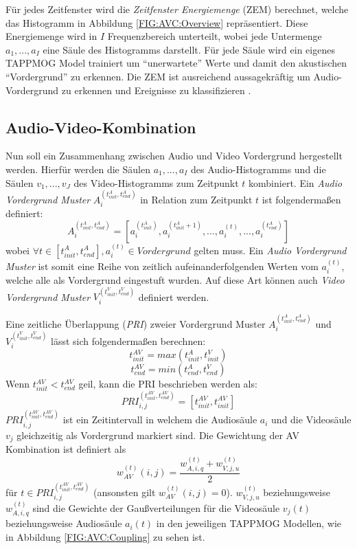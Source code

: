 Für jedes Zeitfenster wird die \textit{Zeitfenster Energiemenge} (ZEM) berechnet, welche das Histogramm in Abbildung \ref{FIG:AVC:Overview} repräsentiert. Diese Energiemenge wird in $I$ Frequenzbereich unterteilt, wobei jede Untermenge $a_1, ..., a_I$ eine Säule des Histogramms darstellt. Für jede Säule wird ein eigenes TAPPMOG Model trainiert um ``unerwartete'' Werte und damit den akustischen ``Vordergrund'' zu erkennen. Die ZEM ist ausreichend aussagekräftig um Audio-Vordergrund zu erkennen und Ereignisse zu klassifizieren \cite{Row:OMSS}.

\subsection{Audio-Video-Kombination}

Nun soll ein Zusammenhang zwischen Audio und Video Vordergrund hergestellt werden. Hierfür werden die Säulen $a_1, ..., a_I$ des Audio-Histogramms und die Säulen $v_1, ..., v_J$ des Video-Histogramms zum Zeitpunkt $t$ kombiniert. Ein \textit{Audio Vordergrund Muster} $A_i^{(t_{init}^A, t_{end}^A)}$ in Relation zum Zeitpunkt $t$ ist folgendermaßen definiert:
\begin{equation}
A_i^{(t_{init}^A, t_{end}^A)} = [a_i^{(t_{init}^A)}, a_i^{(t_{init}^A+1)}, ..., a_i^{(t)}, ..., a_i^{(t_{end}^A)} ]
\end{equation}
wobei $\forall t \in [t_{init}^A, t_{end}^A], a_i^{(t)} \in Vordergrund$ gelten muss. Ein \textit{Audio Vordergrund Muster} ist somit eine Reihe von zeitlich aufeinanderfolgenden Werten vom $a_i^{(t)}$, welche alle als Vordergrund eingestuft wurden. Auf diese Art können auch \textit{Video Vordergrund Muster} $V_i^{(t_{init}^V, t_{end}^V)}$ definiert werden.

Eine zeitliche Überlappung (\textit{PRI}) zweier Vordergrund Muster $A_i^{(t_{init}^A, t_{end}^A)}$ und $V_i^{(t_{init}^V, t_{end}^V)}$ lässt sich folgendermaßen berechnen:
\begin{equation}
t_{init}^{AV} = max(t_{init}^A, t_{init}^V)  
\end{equation}
\begin{equation}
t_{end}^{AV} = min(t_{end}^A, t_{end}^V)
\end{equation}
Wenn $t_{init}^{AV} < t_{end}^{AV}$ geil, kann die PRI beschrieben werden als:
\begin{equation}
PRI_{i, j}^{(t_{init}^{AV}, t_{end}^{AV})} = [t_{init}^{AV},t_{init}^{AV}]
\end{equation}
$PRI_{i, j}^{(t_{init}^{AV}, t_{end}^{AV})}$ ist ein Zeitintervall in welchem die Audiosäule $a_i$ und die Videosäule $v_j$ gleichzeitig als Vordergrund markiert sind. Die Gewichtung der AV Kombination ist definiert als 
\begin{equation}
w_{AV}^{(t)}(i, j) = \frac{w_{A, i, q}^{(t)} + w_{V, j, u}^{(t)}}{2} 
\end{equation}
für $t \in PRI_{i, j}^{(t_{init}^{AV}, t_{end}^{AV})}$ (ansonsten gilt $w_{AV}^{(t)}(i, j) = 0$). $w_{V, j, u}^{(t)}$ beziehungsweise $w_{A, i, q}^{(t)}$ sind die Gewichte der Gaußverteilungen für die Videosäule $v_j(t)$ beziehungsweise Audiosäule $a_i(t)$ in den jeweiligen TAPPMOG Modellen, wie in Abbildung \ref{FIG:AVC:Coupling} zu sehen ist.

